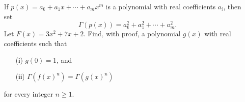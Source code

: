 If $p(x)= a_0 + a_1 x + \cdots + a_m x^m$ is a polynomial with real
coefficients $a_i$, then set
\[
\Gamma(p(x)) = a_0^2 + a_1^2 + \cdots + a_m^2.
\]
Let $F(x) = 3x^2+7x+2$. Find, with proof, a polynomial $g(x)$ with
real coefficients such that
\begin{enumerate}
\item[(i)] $g(0)=1$, and
\item[(ii)] $\Gamma(f(x)^n) = \Gamma(g(x)^n)$
\end{enumerate}
for every integer $n \geq 1$.

